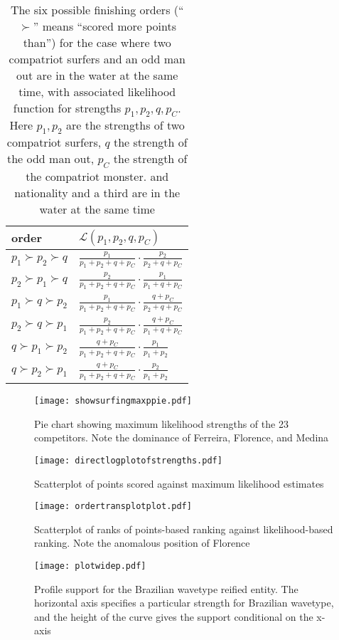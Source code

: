 \documentclass{article}
\begin{document}
\clearpage
\newpage

\begin{table}[h]
\begin{tabular}{l|l}
order  & ${\mathcal L}(p_1,p_2,q,p_C)$\\ \hline
$p_1\succ p_2\succ q $ & $ \frac{p_1}{p_1+p_2+q+p_C}\cdot\frac{p_2}{p_2+q+p_C}$\\
$p_2\succ p_1\succ q $ & $ \frac{p_2}{p_1+p_2+q+p_C}\cdot\frac{p_1}{p_1+q+p_C}$\\
$p_1\succ q\succ p_2 $ & $ \frac{p_1}{p_1+p_2+q+p_C}\cdot\frac{q+p_C}{p_2+q+p_C}$\\
$p_2\succ q\succ p_1 $ & $ \frac{p_2}{p_1+p_2+q+p_C}\cdot\frac{q+p_C}{p_1+q+p_C}$\\
$q\succ p_1\succ p_2 $ & $ \frac{q+p_C}{p_1+p_2+q+p_C}\cdot\frac{p_1}{p_1+p_2}$\\
$q\succ p_2\succ p_1 $ & $ \frac{q+p_C}{p_1+p_2+q+p_C}\cdot\frac{p_2}{p_1+p_2}$\\
\end{tabular}
\caption{The \label{likelihoodcompatriot} six possible finishing
  orders (``$\succ$'' means ``scored more points than'') for the case
  where two compatriot surfers and an odd man out are in the water at
  the same time, with associated likelihood function for strengths
  $p_1,p_2,q, p_C$.  Here $p_1,p_2$ are the strengths of two
  compatriot surfers, $q$ the strength of the odd man out, $p_C$ the
  strength of the compatriot monster. and nationality and a third are
  in the water at the same time}
\end{table}

\clearpage
\newpage

\begin{figure}[h]
\texttt{[image: showsurfingmaxppie.pdf]} %
\caption{Pie chart\label{piechartmax} showing maximum likelihood strengths of the 23 competitors.  Note the
dominance of Ferreira, Florence, and Medina}
\end{figure}

\clearpage
\newpage

\begin{figure}[h]
\texttt{[image: directlogplotofstrengths.pdf]}
\caption{Scatterplot of points scored  \label{compare_likelihood_points}
against maximum likelihood estimates}
\end{figure}

\clearpage
\newpage

\begin{figure}[h]
\texttt{[image: ordertransplotplot.pdf]}
\caption{Scatterplot of ranks \label{compare_likelihood_points_rankings} of points-based ranking
against likelihood-based ranking.  Note the anomalous position of
Florence}
\end{figure}

\clearpage
\newpage

\begin{figure}[h]
  \texttt{[image: plotwidep.pdf]}
\caption{Profile support \label{brazilian_wavetype_support} for the
  Brazilian wavetype reified entity.  The horizontal axis specifies a
  particular strength for Brazilian wavetype, and the height of the
  curve gives the support conditional on the x-axis}
\end{figure}
\end{document}
